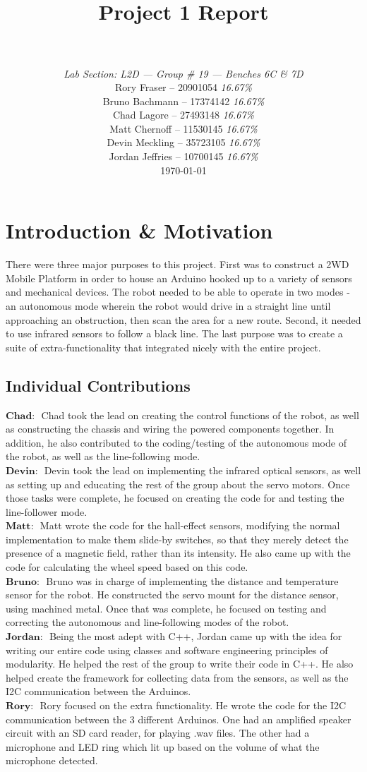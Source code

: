 \documentclass[paper=a4, fontsize=11pt]{scrartcl}
\title{
		\usefont{OT1}{bch}{b}{n}
		\horrule{0.5pt} \\[0.4cm]
		\huge Project 1 Report\\
		\horrule{2pt} \\[0.5cm]
}
\author{
		\textit{Lab Section: L2D   ---  Group \# 19 --- Benches 6C \& 7D}
		\normalfont 						\normalsize 
        \\ Rory Fraser -- 20901054 \textit{16.67\%}
        \\Bruno Bachmann -- 17374142  \textit{16.67\%}
        \\Chad Lagore -- 27493148 \textit{16.67\%}
        \\Matt Chernoff -- 11530145 \textit{16.67\%}
          \\Devin Meckling -- 35723105  \textit{16.67\%}
          \\Jordan Jeffries -- 10700145 \textit{16.67\%}\\	\normalsize
        \today
}
\date{}
\numberwithin{equation}{section}		%
\numberwithin{figure}{section}			%
\numberwithin{table}{section}				%
\begin{document}
\maketitle
\newpage
\pagebreak
\section{Introduction \& Motivation}
There were three major purposes to this project. First was to construct a 2WD Mobile Platform in order to house an Arduino hooked up to a variety of sensors and mechanical devices. The robot needed to be able to operate in two modes - an autonomous mode wherein the robot would drive in a straight line until approaching an obstruction, then scan the area for a new route. Second, it needed to use infrared sensors to follow a black line. The last purpose was to create a suite of extra-functionality that integrated nicely with the entire project.
\subsection{Individual Contributions}
$\textbf{Chad: }$ Chad took the lead on creating the control functions of the robot, as well as constructing the chassis and wiring the powered components together. In addition, he also contributed to the coding/testing of the autonomous mode of the robot, as well as the line-following mode.\\
$\textbf{Devin: }$ Devin took the lead on implementing the infrared optical sensors, as well as setting up and educating the rest of the group about the servo motors. Once those tasks were complete, he focused on creating the code for and testing the line-follower mode. \\
$\textbf{Matt: }$ Matt wrote the code for the hall-effect sensors, modifying the normal implementation to make them slide-by switches, so that they merely detect the presence of a magnetic field, rather than its intensity. He also came up with the code for calculating the wheel speed based on this code.\\
$\textbf{Bruno: }$ Bruno was in charge of implementing the distance and temperature sensor for the robot. He constructed the servo mount for the distance sensor, using machined metal. Once that was complete, he focused on testing and correcting the autonomous and line-following modes of the robot.\\
$\textbf{Jordan: }$ Being the most adept with C++, Jordan came up with the idea for writing our entire code using classes and software engineering principles of modularity. He helped the rest of the group to write their code in C++. He also helped create the framework for collecting data from the sensors, as well as the I2C communication between the Arduinos.\\
$\textbf{Rory: }$ Rory focused on the extra functionality. He wrote the code for the I2C communication between the 3 different Arduinos. One had an amplified speaker circuit with an SD card reader, for playing .wav files. The other had a microphone and LED ring which lit up based on the volume of what the microphone detected.\\
\end{document}
